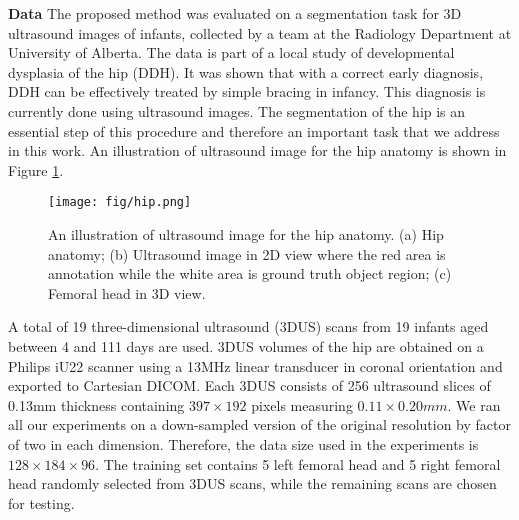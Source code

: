 
\noindent
{\bf Data} 
The proposed method was evaluated on a segmentation task for 3D ultrasound images of infants, collected by a team at the Radiology Department at University of Alberta. The data is part of a local study of developmental dysplasia of the hip (DDH)\cite{hareendranathan2017semiautomatic}. It was shown that  with a correct early diagnosis, DDH can be effectively treated by simple bracing in infancy. This diagnosis is currently done using ultrasound images. The segmentation of the hip is an essential step of this procedure and therefore an important task that we address in this work. An illustration of ultrasound image for the hip anatomy is shown in Figure \ref{fig:hip}.


\begin{figure}[tb]
\centering
\centerline{\texttt{[image: fig/hip.png]}}
\caption{An illustration of ultrasound image for the hip anatomy. (a) Hip anatomy; (b) Ultrasound image in 2D view where the red area is annotation while the white area is ground truth object region; (c) Femoral head in 3D view.}
\label{fig:hip}
\end{figure}

A total of 19 three-dimensional ultrasound (3DUS) scans from 19 infants aged between 4 and 111 days are used. 3DUS volumes of the hip are obtained on a Philips iU22 scanner using a 13MHz linear transducer in coronal orientation and exported to Cartesian DICOM. Each 3DUS consists of 256 ultrasound slices of 0.13mm thickness containing $397\times192$ pixels measuring $0.11\times0.20mm$. We ran all our experiments on a down-sampled version of the original resolution by factor of two in each dimension. 
Therefore, the data size used in the experiments is $128\times184\times96$. The training set contains 5 left femoral head and 5 right femoral head randomly selected from 3DUS scans, while the remaining scans are chosen for testing.

